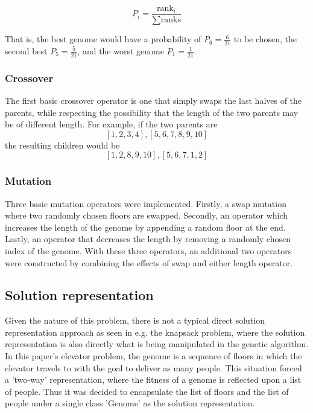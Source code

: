     $$ P_i = \frac{\text{rank}_i}{\sum \text{ranks}} $$

    That is, the best genome would have a probability of $ P_6 = \frac{6}{21} $ to be chosen, the second best $ P_5 = \frac{5}{21} $, and the worst genome $ P_1 = \frac{1}{21} $.

\subsubsection{Crossover}

	The first basic crossover operator is one that simply swaps the last halves of the parents, while respecting the possibility that the length of the two parents may be of different length. For example, if the two parents are $$ [1, 2, 3, 4], [5, 6, 7, 8, 9, 10] $$ the resulting children would be $$ [1, 2, 8, 9, 10], [5, 6, 7, 1, 2] $$


\subsubsection{Mutation}

	Three basic mutation operators were implemented. Firstly, a swap mutation where two randomly chosen floors are swapped. Secondly, an operator which increases the length of the genome by appending a random floor at the end. Lastly, an operator that decreases the length by removing a randomly chosen index of the genome. With these three operators, an additional two operators were constructed by combining the effects of swap and either length operator.


\subsection{Solution representation}

    Given the nature of this problem, there is not a typical direct solution representation approach as seen in e.g. the knapsack problem, where the solution representation is also directly what is being manipulated in the genetic algorithm. In this paper's elevator problem, the genome is a sequence of floors in which the elevator travels to with the goal to deliver as many people. This situation forced a 'two-way' representation, where the fitness of a genome is reflected upon a list of people. Thus it was decided to encapsulate the list of floors and the list of people under a single class 'Genome' as the solution representation.

